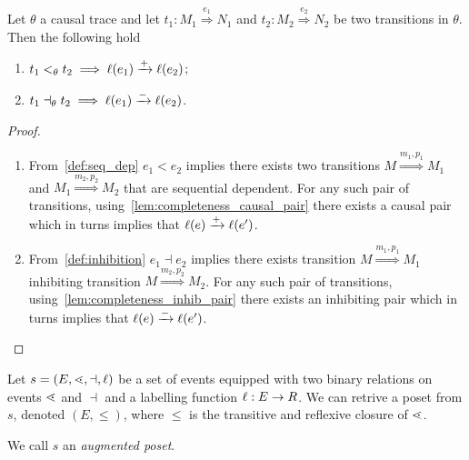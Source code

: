 \begin{lemma}
  \label{lemma:pos_infl}
  Let $\theta$ a causal trace and let $t_1:M_1\overset{e_1}{\Rightarrow}N_1$ and $t_2:M_2\overset{e_2}{\Rightarrow}N_2$ be two transitions in $\theta$. Then the following hold
  \begin{enumerate}
  \item $t_1 <_{\theta} t_2\implies \ell(e_1)\xrightarrow{+}\ell(e_2)$;
  \item $t_1\dashv_{\theta} t_2 \implies\ell(e_1)\xrightarrow{-}\ell(e_2)$.
  \end{enumerate}
\end{lemma}
\begin{proof}
  \begin{enumerate}
  \item From~\autoref{def:seq_dep} $e_1 < e_2$ implies there exists two transitions $M\overset{m_1,p_1}{\Rightarrow} M_1$ and $M_1\overset{m_2,p_2}{\Rightarrow} M_2$ that are sequential dependent. For any such pair of transitions, using~\autoref{lem:completeness_causal_pair} there exists a causal pair which in turns implies that $\ell(e)\xrightarrow{+}\ell(e')$.

  \item From~\autoref{def:inhibition} $e_1 \dashv e_2$ implies there exists transition $M\overset{m_1,p_1}{\Rightarrow} M_1$ inhibiting transition $M\overset{m_2,p_2}{\Rightarrow} M_2$. For any such pair of transitions, using~\autoref{lem:completeness_inhib_pair} there exists an inhibiting pair which in turns implies that $\ell(e)\xrightarrow{-}\ell(e')$.
  \end{enumerate}
\end{proof}


\begin{definition}
  Let $s=(E, \lessdot,\dashv,\ell)$ be a set of events equipped with two binary relations on events $\lessdot$ and $\dashv$ and a labelling function $\ell:E\to R$. We can retrive a poset from $s$, denoted $(E,\leq)$, where $\leq$ is the transitive and reflexive closure of $\lessdot$.

We call $s$ an \emph{augmented poset}.
\end{definition}


